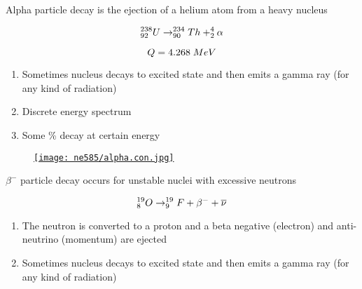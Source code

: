 \documentclass[aspectratio=1610,pdftex,dvipsnames,compress,xcolor={dvipsnames}]{beamer}
\begin{document}
\begin{frame}{Alpha particle decay is the ejection of a helium atom from a heavy nucleus}

    \begin{equation}
        \LARGE
        ^{238}_{92}U \rightarrow ^{234}_{90}Th + ^{4}_{2}\alpha  
    \end{equation}

    \begin{equation}
        \LARGE
        Q = 4.268 \; MeV
    \end{equation}

    \vspace*{\fill}

    \begin{enumerate}[series=outerlist,topsep=0pt,itemsep=21pt,leftmargin=*,label=(\arabic*)]
        \item[]Sometimes nucleus decays to excited state and then emits a gamma ray (for any kind of radiation)
        \item[]Discrete energy spectrum
        \item[]Some \% decay at certain energy
    \end{enumerate}
\end{frame}


\begin{frame}{}
    \begin{figure}
        \centering
        \href{https://courses.ecampus.oregonstate.edu/ne581/three/images/chart32.gif}{\texttt{[image: ne585/alpha.con.jpg]}}
    \end{figure}
\end{frame}


\begin{frame}{$\beta^-$ particle decay occurs for unstable nuclei with excessive neutrons}

    \begin{equation}
        \LARGE
        ^{19}_{8}O \rightarrow ^{19}_{9}F + \beta^{-} + \overline{\nu} 
    \end{equation}

    \vspace*{\fill}

    \begin{enumerate}[series=outerlist,topsep=0pt,itemsep=21pt,leftmargin=*,label=(\arabic*)]
        \item[]The neutron is converted to a proton and a beta negative (electron) and anti-neutrino (momentum) are ejected
        \item[]Sometimes nucleus decays to excited state and then emits a gamma ray (for any kind of radiation)
    \end{enumerate}
\end{frame}
\end{document}
